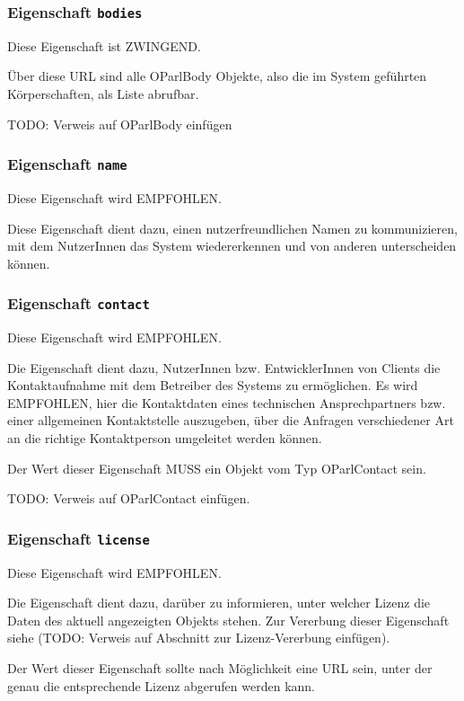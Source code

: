 \documentclass[,a4paper]{article}
\begin{document}
\subsubsection{Eigenschaft \texttt{bodies}}

Diese Eigenschaft ist ZWINGEND.

Über diese URL sind alle OParlBody Objekte, also die im System geführten
Körperschaften, als Liste abrufbar.

TODO: Verweis auf OParlBody einfügen

\subsubsection{Eigenschaft \texttt{name}}

Diese Eigenschaft wird EMPFOHLEN.

Diese Eigenschaft dient dazu, einen nutzerfreundlichen Namen zu
kommunizieren, mit dem NutzerInnen das System wiedererkennen und von
anderen unterscheiden können.

\subsubsection{Eigenschaft \texttt{contact}}

Diese Eigenschaft wird EMPFOHLEN.

Die Eigenschaft dient dazu, NutzerInnen bzw. EntwicklerInnen von Clients
die Kontaktaufnahme mit dem Betreiber des Systems zu ermöglichen. Es
wird EMPFOHLEN, hier die Kontaktdaten eines technischen Ansprechpartners
bzw. einer allgemeinen Kontaktstelle auszugeben, über die Anfragen
verschiedener Art an die richtige Kontaktperson umgeleitet werden
können.

Der Wert dieser Eigenschaft MUSS ein Objekt vom Typ OParlContact sein.

TODO: Verweis auf OParlContact einfügen.

\subsubsection{Eigenschaft \texttt{license}}

Diese Eigenschaft wird EMPFOHLEN.

Die Eigenschaft dient dazu, darüber zu informieren, unter welcher Lizenz
die Daten des aktuell angezeigten Objekts stehen. Zur Vererbung dieser
Eigenschaft siehe (TODO: Verweis auf Abschnitt zur Lizenz-Vererbung
einfügen).

Der Wert dieser Eigenschaft sollte nach Möglichkeit eine URL sein, unter
der genau die entsprechende Lizenz abgerufen werden kann.
\end{document}
